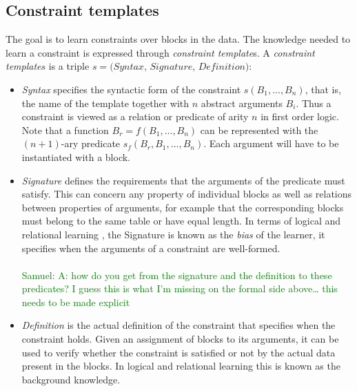 \documentclass{IEEEtran}
\newcommand{\samuel}[1]{\textcolor{green}{{\sc Samuel:} #1}\xspace}
\newcommand{\format}[1]{\textit{#1}\xspace}
\newcommand{\template}{\format{constraint template}}
\newcommand{\CName}{Syntax\xspace}
\newcommand{\CSignature}{Signature\xspace}
\newcommand{\CFunction}{Definition\xspace}
\theoremstyle{definition}
\begin{document}
\subsection{Constraint templates}
The goal is to learn constraints over blocks in the data. The knowledge needed to learn a constraint is expressed through {\template}s.
%
A \template $s$ is a triple $s=\textit{(\CName, \CSignature, \CFunction)}$:
\begin{itemize}
\item
\textit{\CName}  specifies the syntactic form of the constraint $s(B_1, ...,B_n)$, that is, the name of the template together
with $n$ abstract arguments $B_i$.
Thus a constraint is viewed as a relation or predicate of arity $n$ in first order logic.
Note that a function $B_r=f(B_1,...,B_n)$ can be represented with the $(n{+}1)$-ary predicate $s_f(B_r,B_1,...,B_n)$.
Each argument will have to be instantiated with a block.

\item \textit{\CSignature} defines the requirements that the arguments of the predicate must satisfy.
This can concern any property of individual blocks as well as relations between properties of arguments, for example that the corresponding blocks must belong to the same table or have equal length.
In terms of logical and relational learning \cite{luc_book}, the \CSignature is known as the {\em bias} of the learner, it specifies when the arguments of a constraint are well-formed.
\\\\
\samuel{A: how do you get from the signature and the definition to these predicates? I guess this is what I'm missing on the formal side above… this needs to be made explicit}
\item \textit{\CFunction} is the actual definition of the constraint that specifies when the constraint holds.
Given an assignment of blocks to its arguments, it can be used to verify whether the constraint is satisfied or not by the actual data present in the blocks. %
In logical and relational learning this is known as the background knowledge. %
\end{itemize}
\end{document}

